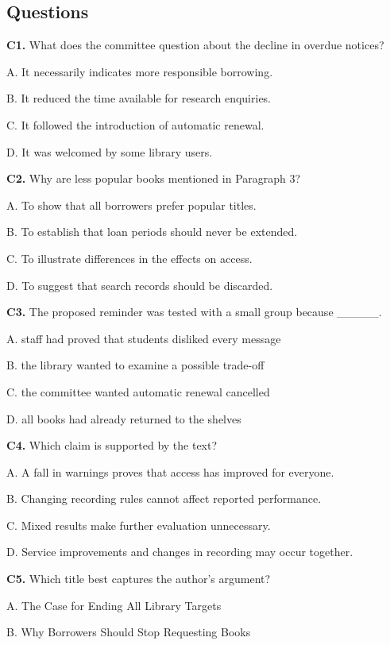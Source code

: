 \documentclass[a4paper,11pt,openany]{report}
\begin{document}
\subsection{Questions}\label{questions-2}

\textbf{C1.} What does the committee question about the decline in overdue notices?

A. It necessarily indicates more responsible borrowing.

B. It reduced the time available for research enquiries.

C. It followed the introduction of automatic renewal.

D. It was welcomed by some library users.

\textbf{C2.} Why are less popular books mentioned in Paragraph 3?

A. To show that all borrowers prefer popular titles.

B. To establish that loan periods should never be extended.

C. To illustrate differences in the effects on access.

D. To suggest that search records should be discarded.

\textbf{C3.} The proposed reminder was tested with a small group because \_\_\_\_\_.

A. staff had proved that students disliked every message

B. the library wanted to examine a possible trade-off

C. the committee wanted automatic renewal cancelled

D. all books had already returned to the shelves

\textbf{C4.} Which claim is supported by the text?

A. A fall in warnings proves that access has improved for everyone.

B. Changing recording rules cannot affect reported performance.

C. Mixed results make further evaluation unnecessary.

D. Service improvements and changes in recording may occur together.

\textbf{C5.} Which title best captures the author's argument?

A. The Case for Ending All Library Targets

B. Why Borrowers Should Stop Requesting Books
\end{document}
